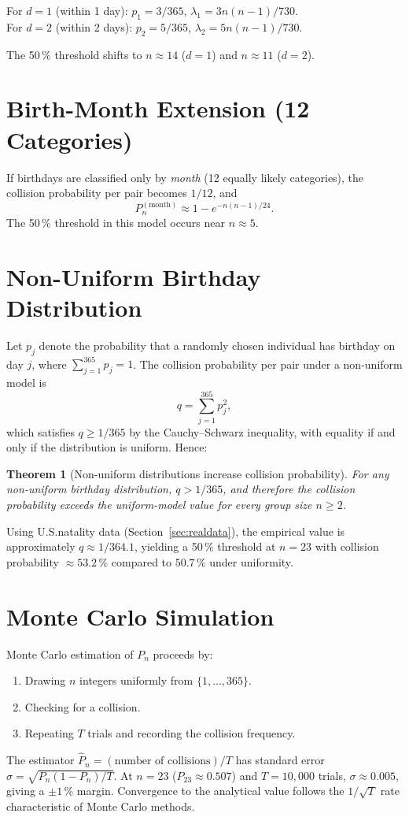 \documentclass[12pt]{report}
\newtheorem{theorem}{Theorem}[chapter]
\theoremstyle{definition}
\begin{document}
For $d=1$ (within 1 day): $p_1 = 3/365$, $\lambda_1 = 3n(n-1)/730$.\\
For $d=2$ (within 2 days): $p_2 = 5/365$, $\lambda_2 = 5n(n-1)/730$.

The 50\,\% threshold shifts to $n \approx 14$ ($d=1$) and $n \approx 11$ ($d=2$).

\section{Birth-Month Extension (12 Categories)}

If birthdays are classified only by \emph{month} (12 equally likely categories),
the collision probability per pair becomes $1/12$, and
\begin{equation}\label{eq:birthmonth}
  P_n^{(\text{month})} \approx 1 - e^{-n(n-1)/24}.
\end{equation}
The 50\,\% threshold in this model occurs near $n \approx 5$.

\section{Non-Uniform Birthday Distribution}

Let $p_j$ denote the probability that a randomly chosen individual has birthday on
day $j$, where $\sum_{j=1}^{365} p_j = 1$.  The collision probability per pair
under a non-uniform model is
\[
  q = \sum_{j=1}^{365} p_j^2,
\]
which satisfies $q \ge 1/365$ by the Cauchy–Schwarz inequality, with equality if and
only if the distribution is uniform.  Hence:

\begin{theorem}[Non-uniform distributions increase collision probability]
\label{thm:nonuniform}
  For any non-uniform birthday distribution,
  $q > 1/365$, and therefore the collision probability exceeds the uniform-model value
  for every group size $n \ge 2$.
\end{theorem}

Using U.S.\@ natality data (Section~\ref{sec:realdata}), the empirical value is
approximately $q \approx 1/364.1$, yielding a 50\,\% threshold at $n = 23$ with
collision probability $\approx 53.2\,\%$ compared to $50.7\,\%$ under uniformity.

\section{Monte Carlo Simulation}

Monte Carlo estimation of $P_n$ proceeds by:
\begin{enumerate}
  \item Drawing $n$ integers uniformly from $\{1,\ldots,365\}$.
  \item Checking for a collision.
  \item Repeating $T$ trials and recording the collision frequency.
\end{enumerate}
The estimator $\hat{P}_n = (\text{number of collisions})/T$ has standard error
$\sigma = \sqrt{P_n(1-P_n)/T}$.  At $n=23$ ($P_{23} \approx 0.507$) and $T = 10{,}000$
trials, $\sigma \approx 0.005$, giving a $\pm 1\,\%$ margin.  Convergence to the
analytical value follows the $1/\sqrt{T}$ rate characteristic of Monte Carlo methods.
\end{document}
